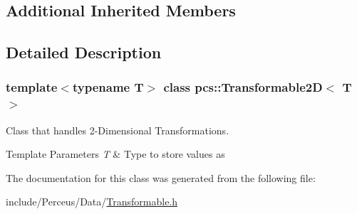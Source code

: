 \subsection*{Additional Inherited Members}


\subsection{Detailed Description}
\subsubsection*{template$<$typename T$>$\newline
class pcs\+::\+Transformable2\+D$<$ T $>$}

Class that handles 2-\/\+Dimensional Transformations. 


\begin{DoxyTemplParams}{Template Parameters}
{\em T} & Type to store values as \\
\hline
\end{DoxyTemplParams}


The documentation for this class was generated from the following file\+:\begin{DoxyCompactItemize}
\item 
include/\+Perceus/\+Data/\hyperlink{Transformable_8h}{Transformable.\+h}\end{DoxyCompactItemize}
